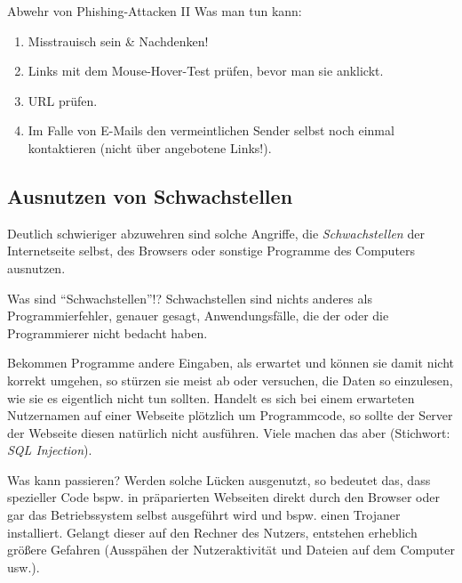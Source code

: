 \documentclass[hyperref={colorlinks,linkcolor=white}, utf8]{beamer}
\begin{document}
	\begin{frame}{Abwehr von Phishing-Attacken II}
		\alert{Was man tun kann:}
		\begin{enumerate}
			\item Misstrauisch sein \& Nachdenken!
			\item Links mit dem Mouse-Hover-Test prüfen, bevor man sie anklickt.
			\item URL prüfen.
			\item Im Falle von E-Mails den vermeintlichen Sender selbst noch einmal kontaktieren (nicht über angebotene Links!).
		\end{enumerate}
	\end{frame}
	
	\subsection{Ausnutzen von Schwachstellen}
	\begin{frame}
		Deutlich schwieriger abzuwehren sind solche Angriffe, die \emph{Schwachstellen} der Internetseite selbst, des Browsers oder sonstige Programme des Computers ausnutzen.
	\end{frame}

	\begin{frame}{Was sind \enquote{Schwachstellen}!?}
		Schwachstellen sind nichts anderes als Programmierfehler, genauer gesagt, Anwendungsfälle, die der oder die Programmierer nicht bedacht haben. 
		
		Bekommen Programme andere Eingaben, als erwartet und können sie damit nicht korrekt umgehen, so stürzen sie meist ab oder versuchen, die Daten so einzulesen, wie sie es eigentlich nicht tun sollten. Handelt es sich bei einem erwarteten Nutzernamen auf einer Webseite plötzlich um Programmcode, so sollte der Server der Webseite diesen natürlich nicht ausführen. Viele machen das aber (Stichwort: \emph{SQL Injection}).		
	\end{frame}

	\begin{frame}{Was kann passieren?}
		Werden solche Lücken ausgenutzt, so bedeutet das, dass spezieller Code bspw. in präparierten Webseiten direkt durch den Browser oder gar das Betriebssystem selbst ausgeführt wird und bspw. einen Trojaner installiert. Gelangt dieser auf den Rechner des Nutzers, entstehen erheblich größere Gefahren (Ausspähen der Nutzeraktivität und Dateien auf dem Computer usw.).
	\end{frame}
\end{document}
